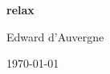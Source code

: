 \documentclass[a4paper, 11pt, twoside, openright]{book}
\begin{document}

\begin{titlepage}
\begin{center}


{\huge \textbf{relax}}


{\Large Edward d'Auvergne}


{\large \today}


\end{center}
\end{titlepage}



\tableofcontents











\end{document}
